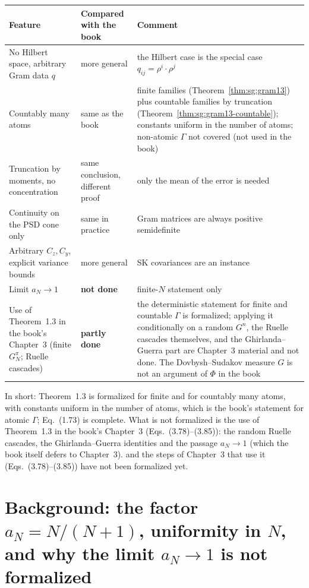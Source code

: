 \begin{center}
\begin{tabular}{p{}p{}p{}}
\textbf{Feature} & \textbf{Compared with the book} & \textbf{Comment}\\ \hline
No Hilbert space, arbitrary Gram data $q$ & more general & the Hilbert case is the special case $q_{ij}=\rho^i\cdot\rho^j$\\
Countably many atoms & same as the book & finite families (Theorem~\ref{thm:sg:gram13}) plus countable families by truncation (Theorem~\ref{thm:sg:gram13-countable}); constants uniform in the number of atoms; non-atomic $\Gamma$ not covered (not used in the book)\\
Truncation by moments, no concentration & same conclusion, different proof & only the mean of the error is needed\\
Continuity on the PSD cone only & same in practice & Gram matrices are always positive semidefinite\\
Arbitrary $C_z,C_y$, explicit variance bounds & more general & SK covariances are an instance\\
Limit $a_N\to1$ & \textbf{not done} & finite-$N$ statement only\\
Use of Theorem~1.3 in the book's Chapter~3 (finite $G^\pi_N$; Ruelle cascades) & \textbf{partly done} & the deterministic statement for finite and countable $\Gamma$ is formalized; applying it conditionally on a random $G^n$, the Ruelle cascades themselves, and the Ghirlanda--Guerra part are Chapter~3 material and not done. The Dovbysh--Sudakov measure $G$ is not an argument of $\Phi$ in the book\\
\end{tabular}
\end{center}

In short: Theorem~1.3 is formalized for finite and for countably many atoms, with constants uniform in the number of atoms, which is the book's statement for atomic $\Gamma$; Eq.~(1.73) is complete. What is not formalized is the use of Theorem~1.3 in the book's Chapter~3 (Eqs.~(3.78)--(3.85)): the random Ruelle cascades, the Ghirlanda--Guerra identities and the passage $a_N\to1$ (which the book itself defers to Chapter~3).
and the steps of Chapter~3 that use it (Eqs.~(3.78)--(3.85)) have not been formalized yet.

\section{Background: the factor $a_N=N/(N+1)$, uniformity in $N$, and why the limit $a_N\to1$ is not formalized}\label{sec:sg:aN-limit}

